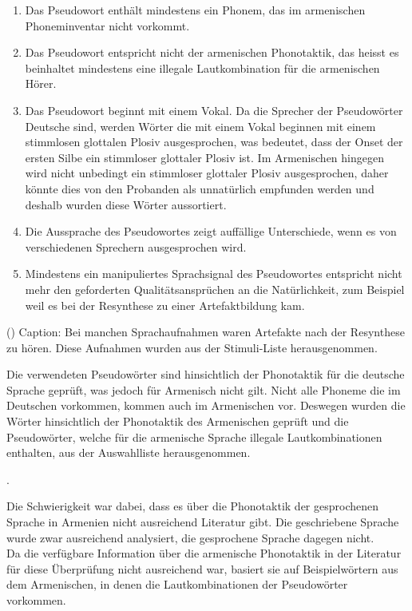 \documentclass[11pt,a4paper,headsepline,twoside,toc=bibliography]{scrreprt}
\begin{document}
\begin{enumerate}
	\item Das Pseudowort enthält	mindestens ein Phonem, das im armenischen Phoneminventar nicht vorkommt.
	\item Das Pseudowort entspricht nicht der armenischen Phonotaktik, das heisst es beinhaltet mindestens eine
	illegale Lautkombination für die armenischen Hörer.
	\item Das Pseudowort beginnt mit einem Vokal.
	Da die Sprecher der Pseudowörter Deutsche sind, werden Wörter die mit einem Vokal beginnen
	mit einem stimmlosen glottalen Plosiv ausgesprochen, was bedeutet, dass der Onset der ersten Silbe ein stimmloser glottaler Plosiv ist. 
	Im Armenischen hingegen wird nicht unbedingt ein stimmloser glottaler Plosiv ausgesprochen, daher könnte dies von den Probanden als unnatürlich empfunden werden und deshalb wurden diese Wörter aussortiert.
	\item Die Aussprache des Pseudowortes zeigt auffällige Unterschiede, wenn es von verschiedenen Sprechern ausgesprochen wird. 
	\item Mindestens ein manipuliertes Sprachsignal des Pseudowortes entspricht nicht mehr den geforderten
	Qualitätsansprüchen an die Natürlichkeit, zum Beispiel weil es bei der Resynthese zu einer Artefaktbildung kam.	
\end{enumerate}


()
Caption: Bei manchen Sprachaufnahmen waren Artefakte nach der Resynthese zu hören. Diese Aufnahmen wurden aus der Stimuli-Liste herausgenommen.


Die verwendeten Pseudowörter sind hinsichtlich der Phonotaktik für die deutsche Sprache geprüft, was jedoch für Armenisch nicht gilt. Nicht alle Phoneme die im Deutschen vorkommen, kommen auch im Armenischen vor. Deswegen wurden die Wörter hinsichtlich der Phonotaktik des Armenischen geprüft und die Pseudowörter, welche für die armenische Sprache illegale Lautkombinationen enthalten, aus der Auswahlliste herausgenommen. 

.

Die Schwierigkeit war dabei, dass es über die Phonotaktik der gesprochenen Sprache in Armenien nicht ausreichend Literatur gibt. Die geschriebene Sprache wurde zwar ausreichend analysiert, die
gesprochene Sprache dagegen nicht. \\

Da die verfügbare Information über die armenische Phonotaktik in der Literatur für diese Überprüfung nicht ausreichend war, basiert sie auf Beispielwörtern aus dem Armenischen, in denen die Lautkombinationen der Pseudowörter vorkommen.
\end{document}
